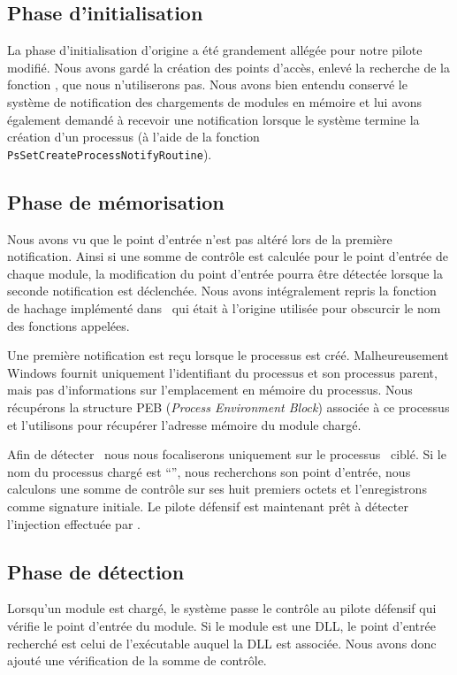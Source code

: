 \subsection{Phase d'initialisation}
La phase d'initialisation d'origine a été grandement allégée pour notre pilote modifié.
Nous avons gardé la création des points d'accès, enlevé la recherche de la fonction \ZwP, que nous n'utiliserons pas.
Nous avons bien entendu conservé le système de notification des chargements de modules en mémoire et lui avons également demandé à recevoir une notification lorsque le système termine la création d'un processus (à l'aide de la fonction \texttt{PsSetCreateProcessNotifyRoutine}).

\subsection{Phase de mémorisation}
Nous avons vu que le point d'entrée n'est pas altéré lors de la première notification.
Ainsi si une somme de contrôle est calculée pour le point d'entrée de chaque module, la modification du point d'entrée pourra être détectée lorsque la seconde notification est déclenchée.
Nous avons intégralement repris la fonction de hachage implémenté dans \duqu\ qui était à l'origine utilisée pour obscurcir le nom des fonctions appelées.

Une première notification est reçu lorsque le processus est créé.
Malheureusement Windows fournit uniquement l'identifiant du processus et son processus parent, mais pas d'informations sur l'emplacement en mémoire du processus.
Nous récupérons la structure PEB (\emph{Process Environment Block}) associée à ce processus et l'utilisons pour récupérer l'adresse mémoire du module chargé.

Afin de détecter \duqu\ nous nous focaliserons uniquement sur le processus \services\ ciblé.
Si le nom du processus chargé est ``\services '', nous recherchons son point d'entrée, nous calculons une somme de contrôle sur ses huit premiers octets et l'enregistrons comme signature initiale.
Le pilote défensif est maintenant prêt à détecter l'injection effectuée par \duqu.

\subsection{Phase de détection}
Lorsqu'un module est chargé, le système passe le contrôle au pilote défensif qui vérifie le point d'entrée du module.
Si le module est une DLL, le point d'entrée recherché est celui de l'exécutable auquel la DLL est associée.
Nous avons donc ajouté une vérification de la somme de contrôle.

